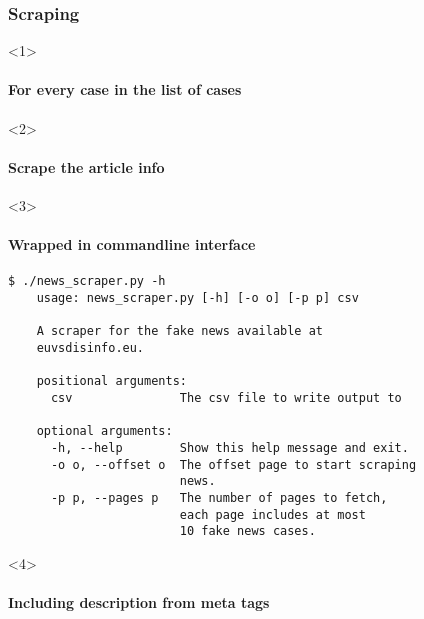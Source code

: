 \documentclass{beamer}
\begin{document}
  \begin{frame}[fragile]
  \frametitle{Scraping}
  \begin{onlyenv}<1> %
    \framesubtitle<1>{For every case in the list of cases}
    
  \end{onlyenv}
  \begin{onlyenv}<2> %
    \framesubtitle<2>{Scrape the article info}
    
  \end{onlyenv}
  \begin{onlyenv}<3>
    \framesubtitle<3>{Wrapped in commandline interface}
    \begin{lstlisting}
$ ./news_scraper.py -h
    usage: news_scraper.py [-h] [-o o] [-p p] csv

    A scraper for the fake news available at
    euvsdisinfo.eu.

    positional arguments:
      csv               The csv file to write output to

    optional arguments:
      -h, --help        Show this help message and exit.
      -o o, --offset o  The offset page to start scraping
                        news.
      -p p, --pages p   The number of pages to fetch,
                        each page includes at most 
                        10 fake news cases.
    \end{lstlisting}
  \end{onlyenv}
  \begin{onlyenv}<4>
    \framesubtitle<4>{Including description from meta tags}
    
  \end{onlyenv}
\end{frame}
\end{document}
